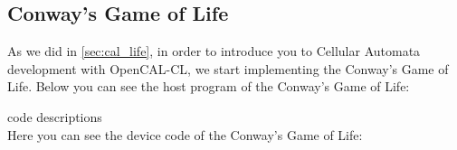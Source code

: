 \subsection{Conway’s Game of Life}

As we did in \ref{sec:cal_life}, in order to introduce you to Cellular Automata 
development with OpenCAL-CL, we start implementing the Conway’s Game of Life.
Below you can see the host program of the Conway’s Game of Life:

code descriptions \\
Here you can see the device code of the Conway’s Game of Life:





  
